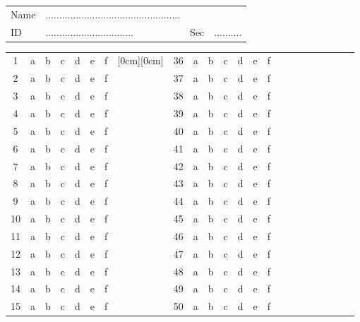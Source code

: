 \documentclass[amsfonts,bezier,leqno,fleqn,12pt,a4paper]{article}
\begin{document}
{{\begin{Large}
\begin{tabular}{llll}
Name & .................................................& & \\
ID &   ................................& Sec & ..........\\
\end{tabular}

\vspace{10mm}


\end{Large}
\begin{normalsize}
\begin{center}
\begin{tabular}{|c|c c c c c c|c|c|c c c c c c|c|c|c c c c c c|}
\cline{1-7}\cline{9-15}
1  & a & b & c & d & e & f & \raisebox{0ex}[0cm][0cm]{\hspace{1cm}} & 36 & a & b & c & d & e & f\\ \cline{1-7}\cline{9-15}
2 & a & b & c & d & e & f & & 37& a & b & c & d & e & f\\ \cline{1-7}\cline{9-15}
3 & a & b & c & d & e & f & & 38& a & b & c & d & e & f\\ \cline{1-7}\cline{9-15}
4 & a & b & c & d & e & f & & 39& a & b & c & d & e & f\\ \cline{1-7}\cline{9-15}
5 & a & b & c & d & e & f & & 40& a & b & c & d & e & f\\ \cline{1-7}\cline{9-15}
6 & a & b & c & d & e & f & & 41& a & b & c & d & e & f\\ \cline{1-7}\cline{9-15}
7 & a & b & c & d & e & f & & 42& a & b & c & d & e & f\\ \cline{1-7}\cline{9-15}
8 & a & b & c & d & e & f & & 43& a & b & c & d & e & f\\ \cline{1-7}\cline{9-15}
9 & a & b & c & d & e & f & & 44& a & b & c & d & e & f\\ \cline{1-7}\cline{9-15}
10 & a & b & c & d & e & f & & 45& a & b & c & d & e & f\\ \cline{1-7}\cline{9-15}
11 & a & b & c & d & e & f & & 46& a & b & c & d & e & f\\ \cline{1-7}\cline{9-15}
12 & a & b & c & d & e & f & & 47& a & b & c & d & e & f\\ \cline{1-7}\cline{9-15}
13 & a & b & c & d & e & f & & 48& a & b & c & d & e & f\\ \cline{1-7}\cline{9-15}
14 & a & b & c & d & e & f & & 49& a & b & c & d & e & f\\ \cline{1-7}\cline{9-15}
15 & a & b & c & d & e & f & & 50& a & b & c & d & e & f\\ \cline{1-7}\cline{9-15}

\end{tabular}
\end{center}
\end{normalsize}}}
\end{document}
